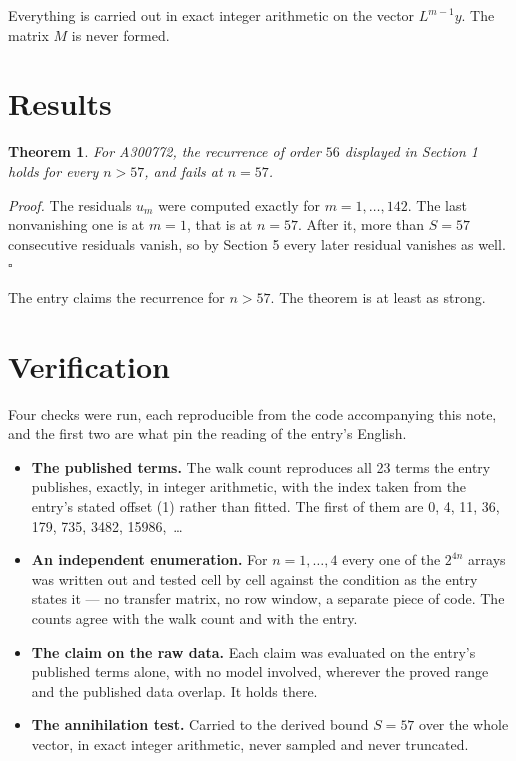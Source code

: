 \documentclass[11pt]{article}
\newtheorem{theorem}{Theorem}
\theoremstyle{definition}
\begin{document}
Everything is carried out in exact integer arithmetic on the vector $L^{m-1}y$. The matrix $M$ is never formed.

\section{Results}

\begin{theorem} For A300772, the recurrence of order $56$ displayed in Section 1 holds for every $n > 57$, and fails at $n = 57$.\end{theorem}

{\itshape Proof.} The residuals $u_m$ were computed exactly for $m = 1,\dots,142$. The last nonvanishing one is at $m = 1$, that is at $n = 57$. After it, more than $S = 57$ consecutive residuals vanish, so by Section 5 every later residual vanishes as well. $\square$

The entry claims the recurrence for $n > 57$. The theorem is at least as strong.

\section{Verification}

Four checks were run, each reproducible from the code accompanying this note, and the first two are what pin the reading of the entry's English.

\begin{itemize}

\item {\bfseries The published terms.} The walk count reproduces all 23 terms the entry publishes, exactly, in integer arithmetic, with the index taken from the entry's stated offset (1) rather than fitted. The first of them are 0, 4, 11, 36, 179, 735, 3482, 15986,~\dots

\item {\bfseries An independent enumeration.} For $n = 1,\dots,4$ every one of the $2^{4n}$ arrays was written out and tested cell by cell against the condition as the entry states it --- no transfer matrix, no row window, a separate piece of code. The counts agree with the walk count and with the entry.

\item {\bfseries The claim on the raw data.} Each claim was evaluated on the entry's published terms alone, with no model involved, wherever the proved range and the published data overlap. It holds there.

\item {\bfseries The annihilation test.} Carried to the derived bound $S = 57$ over the whole vector, in exact integer arithmetic, never sampled and never truncated.

\end{itemize}
\end{document}
